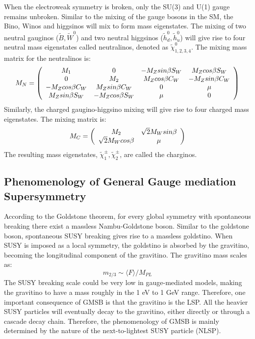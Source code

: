 \documentclass[thesis.tex]{subfiles}
\begin{document}
When the electroweak symmetry is broken, only the SU(3) and U(1) gauge remains unbroken. 
Similar to the mixing of the gauge bosons in the SM, the Bino, Winos and higgsinos will mix to form mass eigenstates.
The mixing of two neutral gauginos ($\widetilde{B}, \widetilde{W}^0$) and two neutral higgsinos ($\widetilde{h}_d^0, \widetilde{h}_u^0$) will give rise to four neutral mass eigenstates called neutralinos, denoted as $\widetilde{\chi}^0_{1,2,3,4}$. The mixing mass matrix for the neutralinos is: 
	\begin{equation}
		 M_N  = \left(
			 \begin{array}{c c c c }
			 	 M_1                           & 0                                & -M_Z sin\beta S_W & M_Z cos\beta S_W  \\
				   0                                & M_2                          & M_Zcos\beta C_W   & -M_Zsin\beta C_W  \\
				 -M_Z cos\beta C_W  & M_Z sin\beta C_W   & 0                                &  \mu \\
				 M_Z sin\beta S_W     & -M_Z cos\beta S_W  & \mu                          &  0
			\end{array}
		\right)
	\end{equation}
Similarly, the charged gaugino-higgsino mixing will give rise to four charged mass eigenstates.
The mixing matrix is: 
	\begin{equation}
		M_C = \left(
			\begin{array}{c c }
				M_2            & \sqrt{2}M_W sin\beta \\
				\sqrt{2}M_W cos\beta     &  \mu   
			\end{array}
		\right)
	\end{equation}
The resulting mass eigenstates, $\widetilde{\chi}^\pm_1, \widetilde{\chi}^\pm_2$, are called the charginos.

\subsection{Phenomenology of General Gauge mediation Supersymmetry}

According to the Goldstone theorem, for every global symmetry with spontaneous breaking there exist a massless Nambu-Goldstone boson. 
Similar to the goldstone boson, spontaneous SUSY breaking gives rise to a massless goldstino. 
When SUSY is imposed as a local symmetry, the goldstino is absorbed by the gravitino, becoming the longitudinal component of the gravitino. 
The gravitino mass scales as:
	\begin{equation}
		m_{2/3} \sim \langle F \rangle/M_{PL}
	\end{equation}
The SUSY breaking scale could be very low in gauge-mediated models, making the gravitino to have a mass roughly in the 1 eV to 1 GeV range.  
Therefore, one important consequence of GMSB is that the gravitino is the LSP. 
All the heavier SUSY particles will eventually decay to the gravitino, either directly or through a cascade decay chain. 
Therefore, the phenomenology of GMSB is mainly determined by the nature of the next-to-lightest SUSY particle (NLSP).
\end{document}

